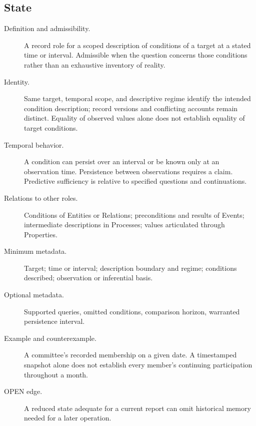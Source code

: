 \documentclass[11pt,a4paper]{article}
\begin{document}
\subsection{State}
\begin{description}
\item[Definition and admissibility.] A record role for a scoped description of conditions of a target at a stated time or interval. Admissible when the question concerns those conditions rather than an exhaustive inventory of reality.
\item[Identity.] Same target, temporal scope, and descriptive regime identify the intended condition description; record versions and conflicting accounts remain distinct. Equality of observed values alone does not establish equality of target conditions.
\item[Temporal behavior.] A condition can persist over an interval or be known only at an observation time. Persistence between observations requires a claim. Predictive sufficiency is relative to specified questions and continuations.
\item[Relations to other roles.] Conditions of Entities or Relations; preconditions and results of Events; intermediate descriptions in Processes; values articulated through Properties.
\item[Minimum metadata.] Target; time or interval; description boundary and regime; conditions described; observation or inferential basis.
\item[Optional metadata.] Supported queries, omitted conditions, comparison horizon, warranted persistence interval.
\item[Example and counterexample.] A committee's recorded membership on a given date. A timestamped snapshot alone does not establish every member's continuing participation throughout a month.
\item[OPEN edge.] A reduced state adequate for a current report can omit historical memory needed for a later operation.
\end{description}
\end{document}
